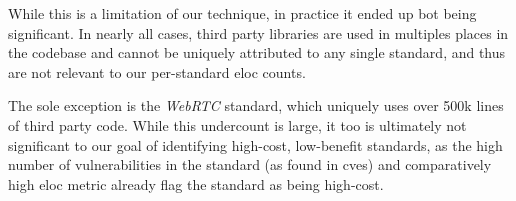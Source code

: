 While this is a limitation of our technique, in practice it ended up bot being
significant.  In nearly all cases, third party libraries are used in multiples
places in the \FF codebase and cannot be uniquely attributed to any single
standard, and thus are not relevant to our per-standard \gls{eloc} counts.

The sole exception is the \textit{WebRTC} standard, which uniquely uses over
500k lines of third party code.  While this undercount is large, it too is
ultimately not significant to our goal of identifying high-cost, low-benefit
standards, as the high number of vulnerabilities in the standard  (as found in
\gls{cve}s) and comparatively high \gls{eloc} metric already flag the standard
as being high-cost.
